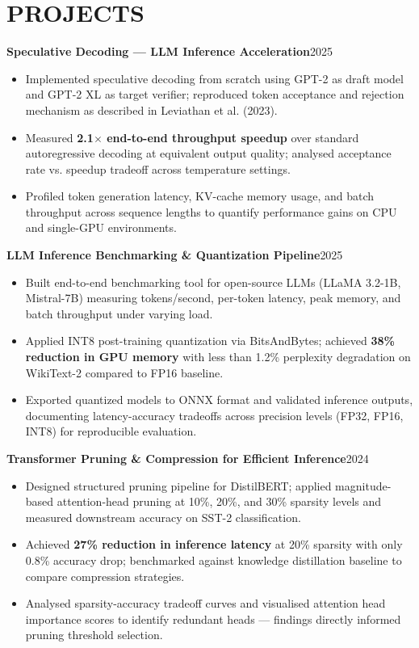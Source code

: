 \documentclass[a4paper,11pt]{article}
\begin{document}
\section*{PROJECTS}
\textbf{Speculative Decoding — LLM Inference Acceleration}\hfill 2025
\begin{itemize}
    \item Implemented speculative decoding from scratch using GPT-2 as draft
    model and GPT-2 XL as target verifier; reproduced token acceptance and
    rejection mechanism as described in Leviathan et al. (2023).
    \item Measured \textbf{2.1$\times$ end-to-end throughput speedup} over
    standard autoregressive decoding at equivalent output quality; analysed
    acceptance rate vs. speedup tradeoff across temperature settings.
    \item Profiled token generation latency, KV-cache memory usage, and batch
    throughput across sequence lengths to quantify performance gains on CPU
    and single-GPU environments.
\end{itemize}
\textbf{LLM Inference Benchmarking \& Quantization Pipeline}\hfill 2025
\begin{itemize}
    \item Built end-to-end benchmarking tool for open-source LLMs
    (LLaMA 3.2-1B, Mistral-7B) measuring tokens/second, per-token latency,
    peak memory, and batch throughput under varying load.
    \item Applied INT8 post-training quantization via BitsAndBytes; achieved
    \textbf{38\% reduction in GPU memory} with less than 1.2\% perplexity
    degradation on WikiText-2 compared to FP16 baseline.
    \item Exported quantized models to ONNX format and validated inference
    outputs, documenting latency-accuracy tradeoffs across precision levels
    (FP32, FP16, INT8) for reproducible evaluation.
\end{itemize}
\textbf{Transformer Pruning \& Compression for Efficient Inference}\hfill 2024
\begin{itemize}
    \item Designed structured pruning pipeline for DistilBERT; applied
    magnitude-based attention-head pruning at 10\%, 20\%, and 30\% sparsity
    levels and measured downstream accuracy on SST-2 classification.
    \item Achieved \textbf{27\% reduction in inference latency} at 20\%
    sparsity with only 0.8\% accuracy drop; benchmarked against knowledge
    distillation baseline to compare compression strategies.
    \item Analysed sparsity-accuracy tradeoff curves and visualised attention
    head importance scores to identify redundant heads — findings directly
    informed pruning threshold selection.
\end{itemize}
\vspace{-0.1cm}
\end{document}
